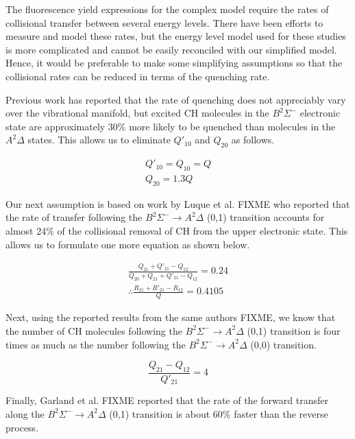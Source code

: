 The fluorescence yield expressions for the complex model require the rates of collisional transfer between several energy levels.
There have been efforts to measure and model these rates, but the energy level model used for these studies is more complicated and cannot be easily reconciled with our simplified model.
Hence, it would be preferable to make some simplifying assumptions so that the collisional rates can be reduced in terms of the quenching rate.

Previous work has reported that the rate of quenching does not appreciably vary over the vibrational manifold, but excited CH molecules in the \(B^2\Sigma^-\) electronic state are approximately 30\% more likely to be quenched than molecules in the \(A^2\Delta\) states.
This allows us to eliminate \(Q'_{10}\) and \(Q_{20}\) as follows.

\begin{gather}
  Q'_{10} = Q_{10} = Q
  \label{eqn:quenchingAssumption1}\\
  Q_{20} = 1.3Q
  \label{eqn:quenchingAssumption2}
\end{gather}

Our next assumption is based on work by Luque et al.\cite{2000-luque} FIXME who reported that the rate of transfer following the \(B^2\Sigma^-\rightarrow A^2\Delta\) (0,1) transition accounts for almost 24\% of the collisional removal of CH from the upper electronic state.
This allows us to formulate one more equation as shown below.

\begin{gather}
  \frac{ Q_{21} + Q'_{21} - Q_{12} }{ Q_{20} + Q_{21} + Q'_{21} - Q_{12} } = 0.24\\
  \therefore \frac{ R_{21} + R'_{21} - R_{12} }{ Q } = 0.4105
  \label{eqn:QEquation1}
\end{gather}

Next, using the reported results from the same authors\cite{2000-luque} FIXME, we know that the number of CH molecules following the \(B^2\Sigma^-\rightarrow A^2\Delta\) (0,1) transition is four times as much as the number following the \(B^2\Sigma^-\rightarrow A^2\Delta\) (0,0) transition.

\begin{equation}
  \frac{ Q_{21} - Q_{12} }{ Q'_{21} } = 4
  \label{eqn:QEquation2}
\end{equation}

Finally, Garland et al.\cite{1985-garland-b} FIXME reported that the rate of the forward transfer along the \(B^2\Sigma^-\rightarrow A^2\Delta\) (0,1) transition is about 60\% faster than the reverse process.

